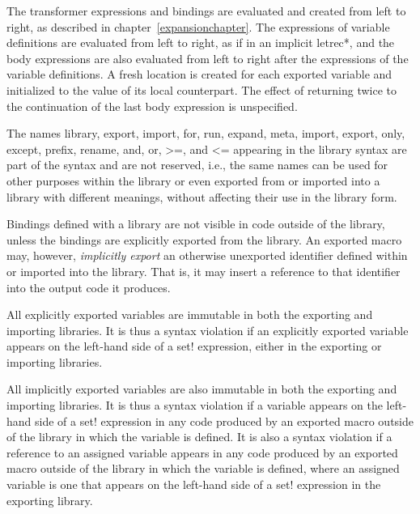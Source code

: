 The transformer expressions and bindings are evaluated and created
from left to right, as described in chapter~\ref{expansionchapter}.
The expressions of variable definitions are evaluated
from left to right, as if in an implicit {\cf letrec*},
and the body expressions are also evaluated from left to right
after the expressions of the variable definitions.
A fresh location is created for each exported variable and initialized
to the value of its local counterpart.
The effect of returning twice to the continuation of the last body
expression is unspecified.

\begin{note}
The names {\cf library}, {\cf export}, {\cf import},
{\cf for}, {\cf run}, {\cf expand}, {\cf meta},
{\cf import}, {\cf export}, {\cf only}, {\cf except}, {\cf
  prefix}, {\cf rename}, {\cf and}, {\cf or}, {\cf >=}, and {\cf <=}
appearing in the library syntax are part of the
syntax and are not reserved, i.e., the same names can be used for other
purposes within the library or even exported from or imported 
into a library with different meanings, without affecting their
use in the {\cf library} form.
\end{note}

Bindings defined with a library are not visible in code
outside of the library, unless the bindings are explicitly exported from the
library. 
An exported macro may, however, \emph{implicitly export} an otherwise
unexported identifier defined within or imported into the library.
That is, it may insert a reference to that identifier into the output code
it produces.

\label{importsareimmutablesection} 
All explicitly exported variables are immutable in both the
exporting and importing libraries. 
It is thus a syntax violation if an
explicitly exported variable appears on the left-hand side of a {\cf set!}
expression, either in the exporting or importing libraries.

All implicitly exported variables are also immutable in both the
exporting and importing libraries.
It is thus a syntax violation if a
variable appears on the left-hand side of a {\cf set!}
expression in any code produced by an exported macro outside of the
library in which the variable is defined.
It is also a syntax violation if a
reference to an assigned variable appears in any code produced by
an exported macro outside of the library in which the variable is defined,
where an assigned variable is one that appears on the left-hand
side of a {\cf set!} expression in the exporting library.

